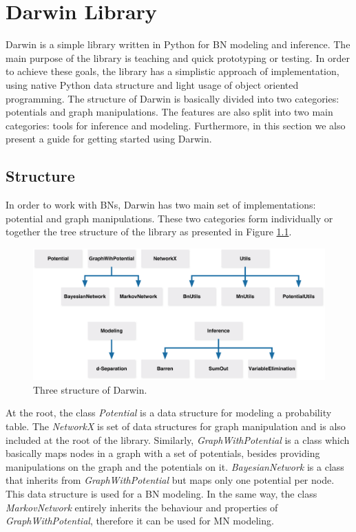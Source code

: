 \chapter{Darwin Library}
\label{sec:darwin_lib}

Darwin is a simple library written in Python for BN modeling and inference.
The main purpose of the library is teaching and quick prototyping or testing.
In order to achieve these goals, the library has a simplistic approach of implementation, using native Python data structure and light usage of object oriented programming.
The structure of Darwin is basically divided into two categories: potentials and graph manipulations.
The features are also split into two main categories: tools for inference and modeling.
Furthermore, in this section we also present a guide for getting started using Darwin.

\section{Structure}
\label{sec:system:sec1}

In order to work with BNs, Darwin has two main set of implementations: potential and graph manipulations.
These two categories form individually or together the tree structure of the library as presented in Figure \ref{fig:tree_darwin}.

\begin{figure}[hbt]
    \begin{center}
        \includegraphics[width=\textwidth]{img/structure_darwin}
    \end{center}
    \caption{Three structure of Darwin.}
    \label{fig:tree_darwin}
\end{figure}

At the root, the class \emph{Potential} is a data structure for modeling a probability table.
The \emph{NetworkX} \cite{hagberg-2008-exploring} is set of data structures for graph manipulation and is also included at the root of the library.
Similarly, \emph{GraphWithPotential} is a class which basically maps nodes in a graph with a set of potentials, besides providing manipulations on the graph and the potentials on it.
\emph{BayesianNetwork} is a class that inherits from \emph{GraphWithPotential} but maps only one potential per node.
This data structure is used for a BN modeling.
In the same way, the class \emph{MarkovNetwork} entirely inherits the behaviour and properties of \emph{GraphWithPotential}, therefore it can be used for MN modeling.

